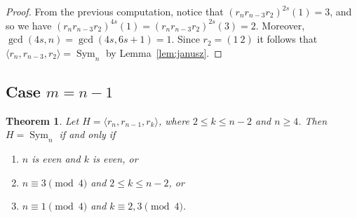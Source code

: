 \documentclass[
final
]{dmtcs-episciences}
\newtheorem{theorem}{Theorem}
\DeclareMathOperator{\Sym}{\mathrm{Sym}}
\begin{document}
\begin{proof}
From the previous computation, notice that $(r_nr_{n-3}r_2)^{2s}(1)=3$, and so we have $(r_nr_{n-3}r_2)^{4s}(1)=(r_nr_{n-3}r_2)^{2s}(3)=2$. Moreover, $\gcd(4s,n)=\gcd(4s,6s+1)=1$. Since $r_2=(1\ 2)$ it follows that $\langle r_n,r_{n-3},r_2\rangle=\Sym_n$ by Lemma~\ref{lem:janusz}. \end{proof}
    

\subsection{Case $m=n-1$}\label{m=n-1}

\medskip

\begin{theorem}\label{thm:n-1}
	Let $H=\langle r_n, r_{n-1}, r_k\rangle$, where $2\leqslant k\leqslant n-2$ and $n\geqslant 4$.
	Then $H=\Sym_n$ if and only if
	\begin{enumerate}
		\item[$(i)$] $n$ is even and $k$ is even, or 
		\item[$(ii)$] $n \equiv 3 \pmod{4}$ and  $2\leqslant k\leqslant n-2$, or
		\item[$(iii)$] $n \equiv 1 \pmod{4}$ and $k \equiv 2, 3 \pmod{4}$. 
	\end{enumerate}
\end{theorem}
\end{document}
